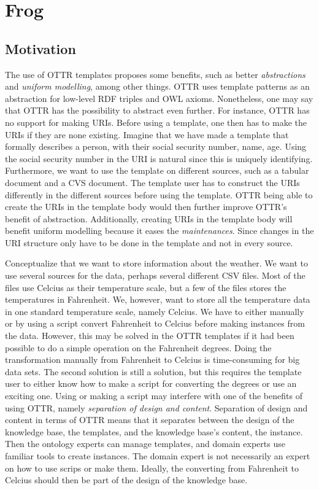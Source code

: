 \section{Frog}

\subsection{Motivation}
The use of OTTR templates proposes some benefits, such as better \emph{abstractions} and \emph{uniform modelling}, among other things. OTTR uses template patterns as an abstraction for low-level RDF triples and OWL axioms. Nonetheless, one may say that OTTR has the possibility to abstract even further. For instance, OTTR has no support for making URIs. Before using a template, one then has to make the URIs if they are none existing. Imagine that we have made a template that formally describes a person, with their social security number, name, age. Using the social security number in the URI is natural since this is uniquely identifying. Furthermore, we want to use the template on different sources, such as a tabular document and a CVS document. The template user has to construct the URIs differently in the different sources before using the template. OTTR being able to create the URIs in the template body would then further improve OTTR's benefit of abstraction. Additionally, creating URIs in the template body will benefit uniform modelling because it eases the \emph{maintenances}. Since changes in the URI structure only have to be done in the template and not in every source.

\para
Conceptualize that we want to store information about the weather. We want to use several sources for the data, perhaps several different CSV files. Most of the files use Celcius as their temperature scale, but a few of the files stores the temperatures in Fahrenheit. We, however, want to store all the temperature data in one standard temperature scale, namely Celcius. We have to either manually or by using a script convert Fahrenheit to Celcius before making instances from the data. However, this may be solved in the OTTR templates if it had been possible to do a simple operation on the Fahrenheit degrees. Doing the transformation manually from Fahrenheit to Celcius is time-consuming for big data sets. The second solution is still a solution, but this requires the template user to either know how to make a script for converting the degrees or use an exciting one. Using or making a script may interfere with one of the benefits of using OTTR, namely \emph{separation of design and content}. Separation of design and content in terms of OTTR means that it separates between the design of the knowledge base, the templates, and the knowledge base's content, the instance. Then the ontology experts can manage templates, and domain experts use familiar tools to create instances. The domain expert is not necessarily an expert on how to use scrips or make them. Ideally, the converting from Fahrenheit to Celcius should then be part of the design of the knowledge base. 

